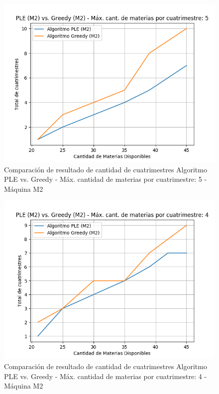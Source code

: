 \documentclass[a4paper]{article}
\begin{document}
\begin{figure}[H]
\centering
\includegraphics[scale=0.65]{Imagenes/m2_PLE_vs_GREEDY_total_cuatrimestres_max_mat_5.png}\par
\caption{Comparación de resultado de cantidad de cuatrimestres Algoritmo PLE vs. Greedy - Máx. cantidad de materias por cuatrimestre: 5 - Máquina M2}
\end{figure}

\begin{figure}[H]
\centering
\includegraphics[scale=0.65]{Imagenes/m2_PLE_vs_GREEDY_total_cuatrimestres_max_mat_4.png}\par
\caption{Comparación de resultado de cantidad de cuatrimestres Algoritmo PLE vs. Greedy - Máx. cantidad de materias por cuatrimestre: 4 - Máquina M2}
\end{figure}
\end{document}
